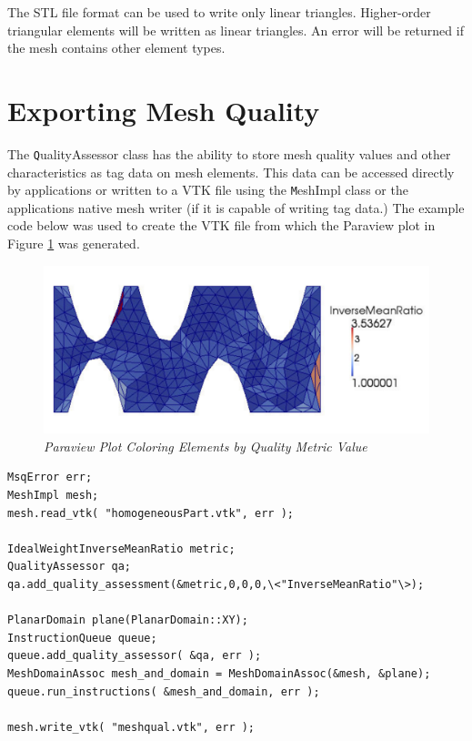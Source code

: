 The STL file format can be used to write only linear triangles.	 Higher-order triangular elements will be written as linear triangles.	An error will be returned if the mesh contains other element types.

\section{Exporting Mesh Quality}

The {\texttt QualityAssessor} class has the ability to store mesh quality values and other characteristics as tag data on mesh elements.  This data can be accessed directly by applications or written to a VTK file using the {\texttt MeshImpl} class or the applications native mesh writer (if it is capable of writing tag data.)	 The example code below was used to create the VTK file from which the Paraview plot in Figure \ref{fig:meshqual} was generated.

\begin{figure}[htb!]
\begin{center}
\includegraphics[width=5in]{figures/meshqual}
\caption{\em Paraview Plot Coloring Elements by Quality Metric Value \label{fig:meshqual}}
\end{center}
\end{figure}

\newpage
\begin{samepage}
\begin{lstlisting}[frame=single]
MsqError err;
MeshImpl mesh;
mesh.read_vtk( "homogeneousPart.vtk", err );

IdealWeightInverseMeanRatio metric;
QualityAssessor qa;
qa.add_quality_assessment(&metric,0,0,0,\<"InverseMeanRatio"\>);

PlanarDomain plane(PlanarDomain::XY);
InstructionQueue queue;
queue.add_quality_assessor( &qa, err );
MeshDomainAssoc mesh_and_domain = MeshDomainAssoc(&mesh, &plane);
queue.run_instructions( &mesh_and_domain, err );

mesh.write_vtk( "meshqual.vtk", err );
\end{lstlisting}
\end{samepage}

